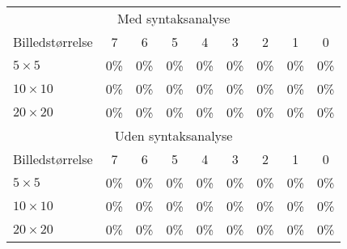 \begin{tabular}{|l|c|c|c|c|c|c|c|c|}\hline
\rowcolor[gray]{0.9} \multicolumn{9}{|>{\columncolor[gray]{0.9}}c|}{\textbf{Kontrolsæt}} \\\hline
\multicolumn{9}{|c|}{Med syntaksanalyse}\\\hline
Billedstørrelse & 7 & 6 & 5 & 4 & 3 & 2 & 1 & 0\\\hline
$5 \times 5$ & 0\% & 0\% & 0\% & 0\% & 0\% & 0\% & 0\% & 0\% \\\hline
$10 \times 10$ & 0\% & 0\% & 0\% & 0\% & 0\% & 0\% & 0\% & 0\%\\\hline
$20 \times 20$ & 0\% & 0\% & 0\% & 0\% & 0\% & 0\% & 0\% & 0\%\\\hline 
\multicolumn{9}{|c|}{Uden syntaksanalyse}\\\hline
Billedstørrelse & 7 & 6 & 5 & 4 & 3 & 2 & 1 & 0\\\hline
$5 \times 5$ & 0\% & 0\% & 0\% & 0\% & 0\% & 0\% & 0\% & 0\% \\\hline
$10 \times 10$ & 0\% & 0\% & 0\% & 0\% & 0\% & 0\% & 0\% & 0\%\\\hline
$20 \times 20$ & 0\% & 0\% & 0\% & 0\% & 0\% & 0\% & 0\% & 0\%\\\hline \end{tabular}

\begin{comment}
\begin{tabular}{|l|c|c|c|}\hline
\rowcolor[gray]{0.9} \multicolumn{4}{|>{\columncolor[gray]{0.9}}c|}{\textbf{Træningssæt}} \\ \hline
Billedstørrelse & Alle tegn & Bogstaver & Tal \\\hline
$5 \times 5$ & 0\% & 0\% & 0\% \\\hline
$10 \times 10$ & 0\% & 0\% & 0\%\\\hline
$20 \times 20$ & 0\% & 0\% & 0\%\\\hline \end{tabular}

\begin{tabular}{|l|c|c|c|}\hline
\rowcolor[gray]{0.9} \multicolumn{4}{|>{\columncolor[gray]{0.9}}c|}{\textbf{Kontrolsæt}} \\ \hline
Billedstørrelse & Alle tegn & Bogstaver & Tal \\\hline
$5 \times 5$ & 0\% & 0\% & 0\% \\\hline
$10 \times 10$ & 0\% & 0\% & 0\%\\\hline
$20 \times 20$ & 0\% & 0\% & 0\%\\\hline \end{tabular}
\end{comment}

